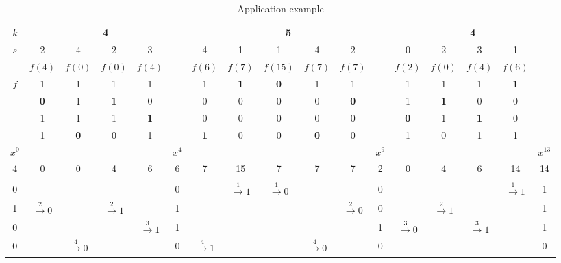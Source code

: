 \begin{table}[t]
\centering
\begin{tabular}{|c|c@{}c@{}c@{}c@{}c|c@{}c@{}c@{}c@{}c@{}c|c@{}c@{}c@{}c@{}c|}
\hline\hline
$k$ &  \multicolumn{5}{|c|}{4} &  \multicolumn{6}{|c|}{5} & \multicolumn{5}{|c|}{4}\\
\hline
$s$ & 2 & 4 & 2 & 3 & & 4 & 1 & 1 & 4 & 2 & & 0 & 2 & 3 & 1 &  \\ \hline
&$f(4)$&$f(0)$&$f(0)$&$f(4)$ &  &$f(6)$ &$f(7)$ &$f(15)$ &$f(7)$ &$f(7)$ & 
&$f(2)$ &$f(0)$ & $f(4)$& $f(6)$&  \\
\multirow{4}{*}{$f$} 
 & 1& 1& 1& 1&
 & 1& \textbf{1} & \textbf{0} &1 &1 &
 &1 & 1& 1&\textbf{1} &
  \\
 & \textbf{0} & 1& \textbf{1} & 0 &
 &0 &0& 0&0 & \textbf{0}&
 &1 &\textbf{1} & 0&0 & \\
 &1 & 1& 1& \textbf{1}&
 &0 &0 &0 &0 &0 &
& \textbf{0} & 1& \textbf{1} & 0 &
  \\
 &1 &\textbf{0} &0 &1 &
 &\textbf{1} &0 &0 &\textbf{0} &0 &
 &1 &0 & 1&1 &
 \\\hline
$x^{0}$ & & & & & $x^{4}$ & & & & & & $x^{9}$ & & & & & $x^{13}$  \\
4 &0 &0 &4 &6&6 &7 &15 &7 &7 &7 &2&0  &4 &6 &14 &14   \\ 
& & &  & & && & & & & & &  & & &   \\
0 & & & & &
0 & & $\xrightarrow{1} 1$ & $\xrightarrow{1} 0$ & & &
0 & & & & $\xrightarrow{1} 1$ &
1  \\
1 & $\xrightarrow{2} 0$ & & $\xrightarrow{2} 1$ &  &
1 & & & & & $\xrightarrow{2} 0$ &
0 & & $\xrightarrow{2} 1$ & & & 
1 \\
0 & & & & $\xrightarrow{3} 1$ &
1 & & & & & &
1 & $\xrightarrow{3} 0$ & & $\xrightarrow{3} 1$ &  &
1 \\
0 & & $\xrightarrow{4} 0$ & & &
0 &$\xrightarrow{4} 1$ & & & $\xrightarrow{4} 0$& &
0 & & & & &
0 \\
\hline\hline
\end{tabular}
\caption{Application example}
\label{table application example}
\end{table}

